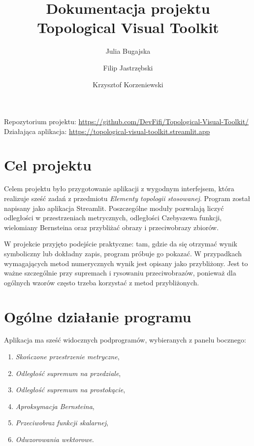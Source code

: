 \documentclass[12pt,a4paper]{article}
\title{\textbf{Dokumentacja projektu}\\Topological Visual Toolkit}
\author{Julia Bugajska \and Filip Jastrzębski \and Krzysztof Korzeniewski}
\date{}
\begin{document}
\maketitle

\begin{center}
    Repozytorium projektu: \url{https://github.com/DevFifi/Topological-Visual-Toolkit/}\\
    Działająca aplikacja: \url{https://topological-visual-toolkit.streamlit.app}
\end{center}

\section{Cel projektu}

Celem projektu było przygotowanie aplikacji z wygodnym interfejsem, która realizuje sześć zadań z przedmiotu \emph{Elementy topologii stosowanej}. Program został napisany jako aplikacja Streamlit. Poszczególne moduły pozwalają liczyć odległości w przestrzeniach metrycznych, odległości Czebyszewa funkcji, wielomiany Bernsteina oraz przybliżać obrazy i przeciwobrazy zbiorów.

W projekcie przyjęto podejście praktyczne: tam, gdzie da się otrzymać wynik symboliczny lub dokładny zapis, program próbuje go pokazać. W przypadkach wymagających metod numerycznych wynik jest opisany jako przybliżony. Jest to ważne szczególnie przy supremach i rysowaniu przeciwobrazów, ponieważ dla ogólnych wzorów często trzeba korzystać z metod przybliżonych.

\section{Ogólne działanie programu}

Aplikacja ma sześć widocznych podprogramów, wybieranych z panelu bocznego:

\begin{enumerate}
    \item \emph{Skończone przestrzenie metryczne},
    \item \emph{Odległość supremum na przedziale},
    \item \emph{Odległość supremum na prostokącie},
    \item \emph{Aproksymacja Bernsteina},
    \item \emph{Przeciwobraz funkcji skalarnej},
    \item \emph{Odwzorowania wektorowe}.
\end{enumerate}
\end{document}

